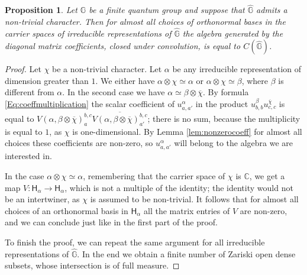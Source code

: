 \documentclass[12pt]{amsart}
\newtheorem{prop}[thm]{Proposition}
\theoremstyle{definition}
\theoremstyle{definition}
\theoremstyle{definition}
\theoremstyle{definition}
\newcommand{\G}{\mathbb{G}}
\newcommand{\C}{\mathbb{C}}
\numberwithin{equation}{section}
\begin{document}
\begin{prop} Let $\G$ be a finite quantum group and 
suppose that $\widehat{\G}$ admits a non-trivial character. Then for almost all choices of orthonormal bases in the carrier spaces of irreducible representations of $\widehat{\G}$ the algebra generated by the diagonal matrix coefficients, closed under convolution, is equal to $C(\widehat{\G})$.
\end{prop}
\begin{proof}
Let $\chi$ be a non-trivial character. Let $\alpha$ be any irreducible representation of dimension greater than $1$. We either have $\alpha \otimes \chi \simeq \alpha$ or $\alpha \otimes \chi \simeq \beta$, where $\beta$ is different from $\alpha$. In the second case we have $\alpha \simeq \beta \otimes \overline{\chi}$. By formula \eqref{Eq:coeffmultiplication} the scalar coefficient of $u_{a,a'}^{\alpha}$ in the product $u_{b,b}^{\beta} u_{c,c}^{\overline{\chi}}$ is equal to $V(\alpha,\beta\otimes \overline{\chi})_{a}^{b,c} \overline{V(\alpha,\beta\otimes \overline{\chi})_{a'}^{b,c}}$; there is no sum, because the multiplicity is equal to $1$, as $\chi$ is one-dimensional. By Lemma \ref{lem:nonzerocoeff} for almost all choices these coefficients are non-zero, so $u_{a,a'}^{\alpha}$ will belong to the algebra we are interested in. 

In the case $\alpha \otimes \chi \simeq \alpha$, remembering that the carrier space of $\chi$ is $\C$, we get a map $V: \mathsf{H}_{\alpha} \to \mathsf{H}_{\alpha}$, which is not a multiple of the identity; the identity would not be an intertwiner, as $\chi$ is assumed to be non-trivial. It follows that for almost all choices of an orthonormal basis in $\mathsf{H}_{\alpha}$ all the matrix entries of $V$ are non-zero, and we can conclude just like in the first part of the proof.

To finish the proof, we can repeat the same argument for all irreducible representations of $\widehat{\G}$. In the end we obtain a finite number of Zariski open dense subsets, whose intersection is of full measure.
\end{proof}
\end{document}
